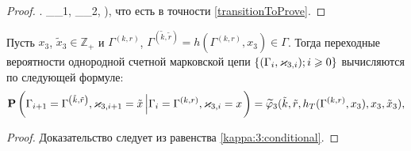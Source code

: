 \documentclass[a4paper,12pt,russian]{extarticle}
\newcommand{\G}{\Gamma}
\newcommand{\MarkThree}{\{(\G_i, \vk_{3,i}); i \geqslant 0\}}
\newcommand{\ga}[1]{\Gamma^{\left( #1 \right)} }
\renewcommand{\Pr}{{\mathbf P}}
\renewcommand{\P}[2]{\Pr\left( #1 \left| #2\right.\right)}
\begin{document}
\begin{proof}
{\left. \times \delta_{_1,}  \delta_{_2,}  \right),
}
что есть в точности \eqref{transitionToProve}.
\end{proof}

\begin{theorem}
Пусть $x_3$, $\tilde{x}_3\in \mathbb{Z}_+$ и $\ga{k,r}$, $\ga{\tilde{k},\tilde{r}}=h(\ga{k,r},x_3) \in \G$. Тогда переходные вероятности однородной счетной марковской цепи $\MarkThree$ вычисляются по следующей формуле:
\begin{equation}
\P{\G_{i+1}=\ga{\tilde{k},\tilde{r}},\vk_{3,i+1}=\tilde{x}}{\G_{i}=\ga{k,r},\vk_{3,i}=x} 
= \widetilde{\vp}_3(\tilde{k},\tilde{r},h_T(\ga{k,r},x_3),x_3,\tilde{x}_3),
\label{transitionToProve:three}
\end{equation}
\end{theorem}
\begin{proof}
Доказательство следует из равенства \eqref{kappa:3:conditional}.
\end{proof}
\end{document}

